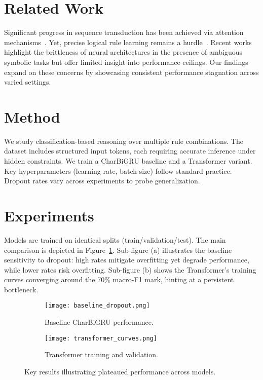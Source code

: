 \section{Related Work}
Significant progress in sequence transduction has been achieved via attention mechanisms~\citep{vaswani2017attention,devlin2019bert}. Yet, precise logical rule learning remains a hurdle~\citep{goodfellow2014explaining}. Recent works highlight the brittleness of neural architectures in the presence of ambiguous symbolic tasks but offer limited insight into performance ceilings. Our findings expand on these concerns by showcasing consistent performance stagnation across varied settings.

\section{Method}
We study classification-based reasoning over multiple rule combinations. The dataset includes structured input tokens, each requiring accurate inference under hidden constraints. We train a CharBiGRU baseline and a Transformer variant. Key hyperparameters (learning rate, batch size) follow standard practice. Dropout rates vary across experiments to probe generalization. 

\section{Experiments}
Models are trained on identical splits (train/validation/test). The main comparison is depicted in Figure~\ref{fig:main_figure}. Sub-figure (a) illustrates the baseline sensitivity to dropout: high rates mitigate overfitting yet degrade performance, while lower rates risk overfitting. Sub-figure (b) shows the Transformer's training curves converging around the 70\% macro-F1 mark, hinting at a persistent bottleneck. 

\begin{figure}[!ht]
\centering
\begin{subfigure}[b]{0.45\textwidth}
  \texttt{[image: baseline\_dropout.png]}
  \caption{Baseline CharBiGRU performance.}
\end{subfigure}
\quad
\begin{subfigure}[b]{0.45\textwidth}
  \texttt{[image: transformer\_curves.png]}
  \caption{Transformer training and validation.}
\end{subfigure}
\caption{Key results illustrating plateaued performance across models.}
\label{fig:main_figure}
\end{figure}

